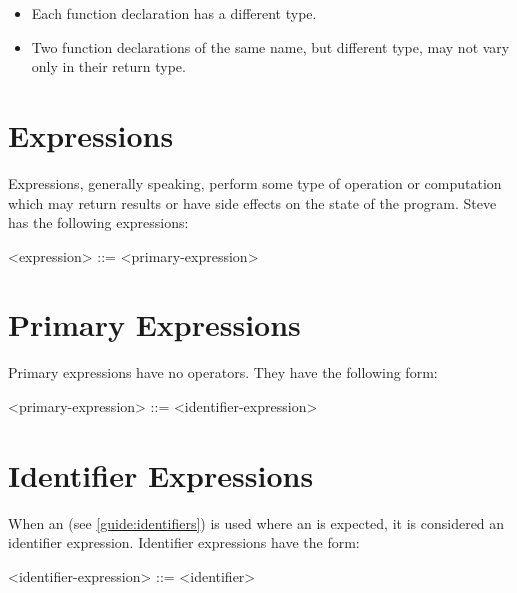 \begin{itemize}
\item Each function declaration has a different type.
\item Two function declarations of the same name, but different type, may not vary only in their return type.
\end{itemize} 

\section{Expressions} \label{guide:expr}

Expressions, generally speaking, perform some type of operation or computation which may return results or have side effects on the state of the program. Steve has the following expressions:

\begin{minip}
\begin{grammar}
<expression> ::=
<primary-expression>
\end{grammar}
\end{minip}

\section{Primary Expressions} \label{guide:primary_expr}

Primary expressions have no operators. They have the following form:

\begin{minip}
\begin{grammar}
<primary-expression> ::= 
<identifier-expression>
\end{grammar}
\end{minip}

\section{Identifier Expressions} \label{guide:id_expr}

When an  (see \ref{guide:identifiers}) is used where an  is expected, it is considered an identifier expression. Identifier expressions have the form:

\begin{minip}
\begin{grammar}
<identifier-expression> ::= <identifier>
\end{grammar}
\end{minip}

